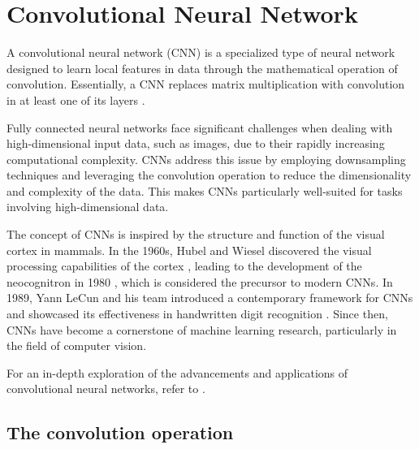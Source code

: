 \documentclass[../../thesis.tex]{subfiles}
\begin{document}
\section{Convolutional Neural Network}

A convolutional neural network (CNN) is a specialized type of neural network designed to learn local features in data through the mathematical operation of convolution. Essentially, a CNN replaces matrix multiplication with convolution in at least one of its layers \cite{deeplearningbook}. \newline

Fully connected neural networks face significant challenges when dealing with high-dimensional input data, such as images, due to their rapidly increasing computational complexity. CNNs address this issue by employing downsampling techniques and leveraging the convolution operation to reduce the dimensionality and complexity of the data. This makes CNNs particularly well-suited for tasks involving high-dimensional data.\newline

The concept of CNNs is inspired by the structure and function of the visual cortex in mammals. In the 1960s, Hubel and Wiesel discovered the visual processing capabilities of the cortex \cite{https://doi.org/10.1113/jphysiol.1968.sp008455}, leading to the development of the neocognitron in 1980 \cite{6313076}, which is considered the precursor to modern CNNs. In 1989, Yann LeCun and his team introduced a contemporary framework for CNNs and showcased its effectiveness in handwritten digit recognition \cite{LeCun1989ConvNet}. Since then, CNNs have become a cornerstone of machine learning research, particularly in the field of computer vision.\newline

For an in-depth exploration of the advancements and applications of convolutional neural networks, refer to \cite{gu2017recent}.

\subsection{The convolution operation}
\end{document}
